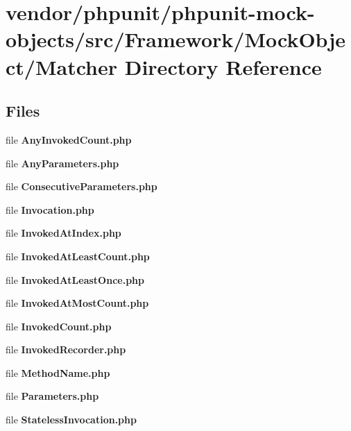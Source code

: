 \section{vendor/phpunit/phpunit-\/mock-\/objects/src/\+Framework/\+Mock\+Object/\+Matcher Directory Reference}
\label{dir_b9c787f43b6dc32d4e1a9a426bdfdb64}
\subsection*{Files}
\begin{DoxyCompactItemize}
\item 
file {\bf Any\+Invoked\+Count.\+php}
\item 
file {\bf Any\+Parameters.\+php}
\item 
file {\bf Consecutive\+Parameters.\+php}
\item 
file {\bf Invocation.\+php}
\item 
file {\bf Invoked\+At\+Index.\+php}
\item 
file {\bf Invoked\+At\+Least\+Count.\+php}
\item 
file {\bf Invoked\+At\+Least\+Once.\+php}
\item 
file {\bf Invoked\+At\+Most\+Count.\+php}
\item 
file {\bf Invoked\+Count.\+php}
\item 
file {\bf Invoked\+Recorder.\+php}
\item 
file {\bf Method\+Name.\+php}
\item 
file {\bf Parameters.\+php}
\item 
file {\bf Stateless\+Invocation.\+php}
\end{DoxyCompactItemize}
